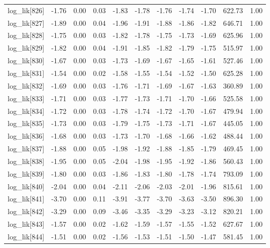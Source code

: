 \begin{table}[ht]
\begin{tabular}{rrrrrrrrrrr}
  log\_lik[826] & -1.76 & 0.00 & 0.03 & -1.83 & -1.78 & -1.76 & -1.74 & -1.70 & 622.73 & 1.00 \\ 
  log\_lik[827] & -1.89 & 0.00 & 0.04 & -1.96 & -1.91 & -1.88 & -1.86 & -1.82 & 646.71 & 1.00 \\ 
  log\_lik[828] & -1.75 & 0.00 & 0.03 & -1.82 & -1.78 & -1.75 & -1.73 & -1.69 & 625.96 & 1.00 \\ 
  log\_lik[829] & -1.82 & 0.00 & 0.04 & -1.91 & -1.85 & -1.82 & -1.79 & -1.75 & 515.97 & 1.00 \\ 
  log\_lik[830] & -1.67 & 0.00 & 0.03 & -1.73 & -1.69 & -1.67 & -1.65 & -1.61 & 527.46 & 1.00 \\ 
  log\_lik[831] & -1.54 & 0.00 & 0.02 & -1.58 & -1.55 & -1.54 & -1.52 & -1.50 & 625.28 & 1.00 \\ 
  log\_lik[832] & -1.69 & 0.00 & 0.03 & -1.76 & -1.71 & -1.69 & -1.67 & -1.63 & 360.89 & 1.00 \\ 
  log\_lik[833] & -1.71 & 0.00 & 0.03 & -1.77 & -1.73 & -1.71 & -1.70 & -1.66 & 525.58 & 1.00 \\ 
  log\_lik[834] & -1.72 & 0.00 & 0.03 & -1.78 & -1.74 & -1.72 & -1.70 & -1.67 & 479.94 & 1.00 \\ 
  log\_lik[835] & -1.73 & 0.00 & 0.03 & -1.79 & -1.75 & -1.73 & -1.71 & -1.67 & 445.05 & 1.00 \\ 
  log\_lik[836] & -1.68 & 0.00 & 0.03 & -1.73 & -1.70 & -1.68 & -1.66 & -1.62 & 488.44 & 1.00 \\ 
  log\_lik[837] & -1.88 & 0.00 & 0.05 & -1.98 & -1.92 & -1.88 & -1.85 & -1.79 & 469.45 & 1.00 \\ 
  log\_lik[838] & -1.95 & 0.00 & 0.05 & -2.04 & -1.98 & -1.95 & -1.92 & -1.86 & 560.43 & 1.00 \\ 
  log\_lik[839] & -1.80 & 0.00 & 0.03 & -1.86 & -1.83 & -1.80 & -1.78 & -1.74 & 793.09 & 1.00 \\ 
  log\_lik[840] & -2.04 & 0.00 & 0.04 & -2.11 & -2.06 & -2.03 & -2.01 & -1.96 & 815.61 & 1.00 \\ 
  log\_lik[841] & -3.70 & 0.00 & 0.11 & -3.91 & -3.77 & -3.70 & -3.63 & -3.50 & 896.30 & 1.00 \\ 
  log\_lik[842] & -3.29 & 0.00 & 0.09 & -3.46 & -3.35 & -3.29 & -3.23 & -3.12 & 820.21 & 1.00 \\ 
  log\_lik[843] & -1.57 & 0.00 & 0.02 & -1.62 & -1.59 & -1.57 & -1.55 & -1.52 & 627.67 & 1.00 \\ 
  log\_lik[844] & -1.51 & 0.00 & 0.02 & -1.56 & -1.53 & -1.51 & -1.50 & -1.47 & 581.45 & 1.00 \\ 

\end{tabular}
\end{table}
